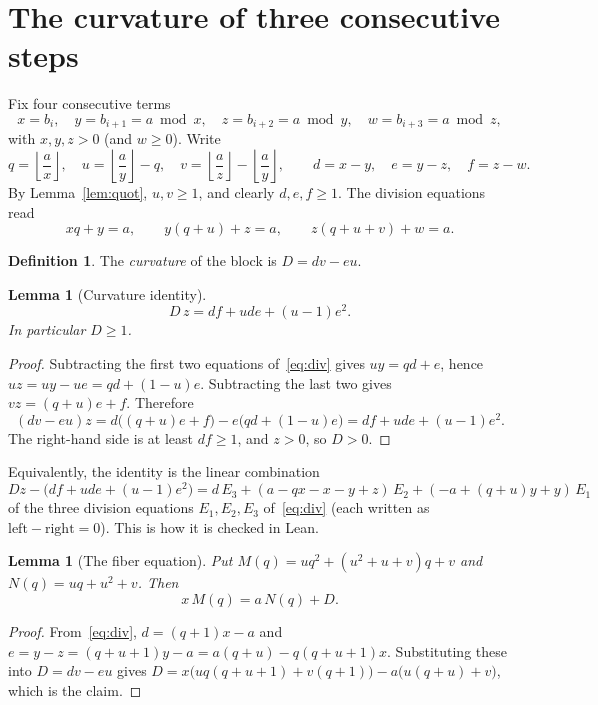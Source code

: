 \documentclass[11pt]{amsart}
\newtheorem{lemma}[theorem]{Lemma}
\theoremstyle{definition}
\newtheorem{definition}[theorem]{Definition}
\theoremstyle{remark}
\begin{document}
\section{The curvature of three consecutive steps}\label{sec:curv}

Fix four consecutive terms
\[
x=b_i,\quad y=b_{i+1}=a\bmod x,\quad z=b_{i+2}=a\bmod y,\quad w=b_{i+3}=a\bmod z,
\]
with $x,y,z>0$ (and $w\ge0$). Write
\[
q=\left\lfloor \frac ax\right\rfloor,\quad
u=\left\lfloor \frac ay\right\rfloor-q,\quad
v=\left\lfloor \frac az\right\rfloor-\left\lfloor \frac ay\right\rfloor,\qquad
d=x-y,\quad e=y-z,\quad f=z-w .
\]
By Lemma~\ref{lem:quot}, $u,v\ge1$, and clearly $d,e,f\ge1$. The division equations read
\begin{equation}\label{eq:div}
xq+y=a,\qquad y(q+u)+z=a,\qquad z(q+u+v)+w=a .
\end{equation}

\begin{definition}
The \emph{curvature} of the block is $D=dv-eu$.
\end{definition}

\begin{lemma}[Curvature identity]\label{lem:curv}
\[
D\,z=df+ude+(u-1)e^2 .
\]
In particular $D\ge1$.
\end{lemma}

\begin{proof}
Subtracting the first two equations of~\eqref{eq:div} gives $uy=qd+e$, hence
$uz=uy-ue=qd+(1-u)e$. Subtracting the last two gives $vz=(q+u)e+f$. Therefore
\[
(dv-eu)z=d\bigl((q+u)e+f\bigr)-e\bigl(qd+(1-u)e\bigr)=df+ude+(u-1)e^2 .
\]
The right-hand side is at least $df\ge1$, and $z>0$, so $D>0$.
\end{proof}

Equivalently, the identity is the linear combination
\[
Dz-\bigl(df+ude+(u-1)e^2\bigr)=d\,E_3+(a-qx-x-y+z)\,E_2+(-a+(q+u)y+y)\,E_1
\]
of the three division equations $E_1,E_2,E_3$ of~\eqref{eq:div} (each written as
$\text{left}-\text{right}=0$). This is how it is checked in Lean.

\begin{lemma}[The fiber equation]\label{lem:fiber-eq}
Put $M(q)=uq^2+(u^2+u+v)q+v$ and $N(q)=uq+u^2+v$. Then
\[
x\,M(q)=a\,N(q)+D .
\]
\end{lemma}

\begin{proof}
From~\eqref{eq:div}, $d=(q+1)x-a$ and $e=y-z=(q+u+1)y-a=a(q+u)-q(q+u+1)x$. Substituting
these into $D=dv-eu$ gives
$D=x\bigl(uq(q+u+1)+v(q+1)\bigr)-a\bigl(u(q+u)+v\bigr)$, which is the claim.
\end{proof}
\end{document}
